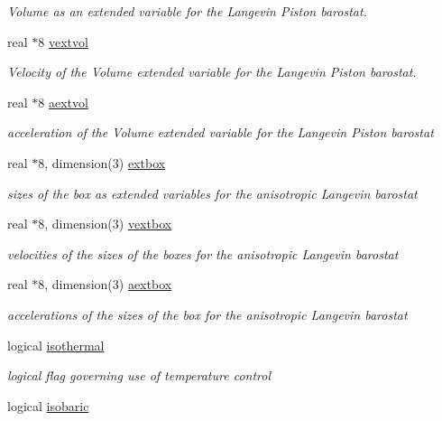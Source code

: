 \begin{DoxyCompactItemize}
\begin{DoxyCompactList}\small\item\em Volume as an extended variable for the Langevin Piston barostat. \end{DoxyCompactList}\item 
real $\ast$8 \hyperlink{classbath_ab58c842917f47d058ccc454f2d86d26e}{vextvol}
\begin{DoxyCompactList}\small\item\em Velocity of the Volume extended variable for the Langevin Piston barostat. \end{DoxyCompactList}\item 
real $\ast$8 \hyperlink{classbath_a8e3c36b77876c501d390f5d4cd5e3214}{aextvol}
\begin{DoxyCompactList}\small\item\em acceleration of the Volume extended variable for the Langevin Piston barostat \end{DoxyCompactList}\item 
real $\ast$8, dimension(3) \hyperlink{classbath_ae29a0bf200662ddefdf2f9abbe0f0497}{extbox}
\begin{DoxyCompactList}\small\item\em sizes of the box as extended variables for the anisotropic Langevin barostat \end{DoxyCompactList}\item 
real $\ast$8, dimension(3) \hyperlink{classbath_abf4f3dff07da5314ccca397e0915b461}{vextbox}
\begin{DoxyCompactList}\small\item\em velocities of the sizes of the boxes for the anisotropic Langevin barostat \end{DoxyCompactList}\item 
real $\ast$8, dimension(3) \hyperlink{classbath_ad443bea48f49b46247715f8a9b556897}{aextbox}
\begin{DoxyCompactList}\small\item\em accelerations of the sizes of the box for the anisotropic Langevin barostat \end{DoxyCompactList}\item 
logical \hyperlink{classbath_a319ca259bea972503f4a8c2ecf7b46e1}{isothermal}
\begin{DoxyCompactList}\small\item\em logical flag governing use of temperature control \end{DoxyCompactList}\item 
logical \hyperlink{classbath_aaa4b05e6c14f0448c7d434cb61a31f41}{isobaric}

\end{DoxyCompactItemize}
